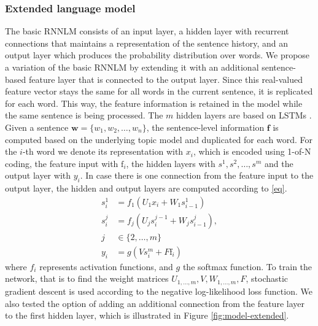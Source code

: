 \documentclass[a4paper]{article}
\begin{document}
\subsubsection{Extended language model}
The basic RNNLM consists of an input layer, a hidden layer with recurrent connections that maintains a representation of the sentence history, and an output layer which produces the probability distribution over words.
We propose a variation of the basic RNNLM by extending it with an additional sentence-based feature layer that is connected to the output layer. Since this real-valued feature vector stays the same for all words in the current sentence, it is replicated for each word. This way, the feature information is retained in the model while the same sentence is being processed.
The $m$ hidden layers are based on LSTMs \cite{hochreiter1997long}.
Given a sentence $\textbf{w} = \{w_1, w_2, \ldots, w_n\}$, the sentence-level information $\textbf{f}$ is computed based on the underlying topic model and duplicated for each word. For the $i$-th word we denote its representation with $x_i$, which is encoded using 1-of-N coding, the feature input with $\text{f}_i$, the hidden layers with $s^1, s^2, \dots, s^m$ and the output layer with $y_i$. In case there is one connection from the feature input to the output layer, the hidden and output layers are computed according to \eqref{eq}.
\begin{equation}
\label{eq}
\begin{aligned}
s^1_i &= f_1(U_1x_i + W_1s^1_{i-1}) \\
s^j_i &= f_j(U_js^{j-1}_i + W_js^j_{i-1}), \\j &\in \{2,\ldots,m\} \\
y_i &= g(Vs^m_i + F\text{f}_i)
\end{aligned}
\end{equation}
where $f_i$ represents activation functions, and $g$ the softmax function.
To train the network, that is to find the weight matrices $U_{1,\dots,m}, V, W_{1,\dots,m}, F$, stochastic gradient descent is used according to the negative log-likelihood loss function. We also tested the option of adding an additional connection from the feature layer to the first hidden layer, which is illustrated in Figure \ref{fig:model-extended}.
\end{document}
